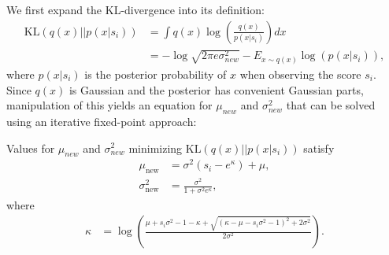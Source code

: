 We first expand the KL-divergence into its definition:
\begin{align}\label{eq:KL}
    \text{KL}\left(q(x)|| p(x|s_i)\right) &= \int q(x) \log \left( \frac{q(x)}{p(x|s_i)} \right) dx \nonumber \\
     \qquad &= -\log\sqrt{2\pi e \sigma_{new}^2} - E_{x\sim q(x)} \log \left( p(x|s_i) \right),
\end{align}
\unindentmore where $p(x|s_i)$ is the posterior probability of $x$ when
observing the score $s_i$. Since $q(x)$ is Gaussian
and the posterior has convenient Gaussian parts, manipulation of this
yields an equation for $\mu_{new}$ and $\sigma_{new}^2$ that can be
solved using an iterative fixed-point approach:
\begin{lemma}
Values for $\mu_{new}$ and $\sigma_{new}^2$
minimizing $\text{KL}\left(q(x)|| p(x|s_i)\right)$
satisfy
\begin{align}\label{eq:ExactMuSigmaNew}
    \mu_{\text{new}} & = \sigma^{2}\left(s_i - e^\kappa\right) + \mu, \nonumber \\
   \sigma_{\text{new}}^2 & = \frac{\sigma^2}{1+\sigma^2 e^\kappa },
\end{align}
where
\begin{align}\label{eq:approximationZQuad5}
     \kappa  &= \log\left(\frac{\mu + s_i\sigma^2-1-\kappa+\sqrt{(\kappa - \mu - s_i\sigma^2 -1)^2+2\sigma^2}}{2\sigma^2}\right).
\end{align}
\end{lemma}
